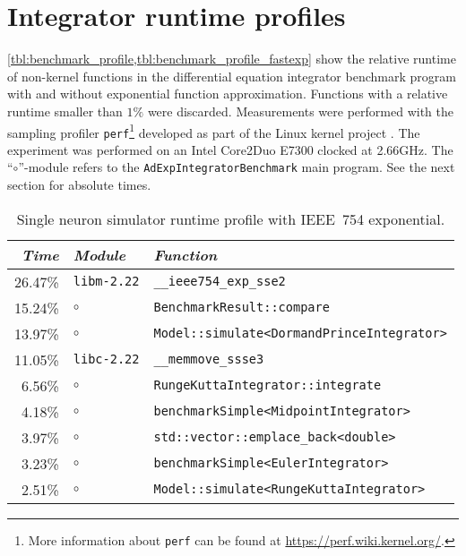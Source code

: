 \section{Integrator runtime profiles}

\cref{tbl:benchmark_profile,tbl:benchmark_profile_fastexp} show the relative runtime of non-kernel functions in the differential equation integrator benchmark program with and without exponential function approximation. Functions with a relative runtime smaller than $1\%$ were discarded. Measurements were performed with the sampling profiler \texttt{perf}\footnote{More information about \texttt{perf} can be found at \url{https://perf.wiki.kernel.org/}.} developed as part of the Linux kernel project \cite{de2010new}. The experiment was performed on an Intel Core2Duo E7300 \CPU clocked at 2.66GHz. The \enquote{$\circ$}-module refers to the \texttt{AdExpIntegratorBenchmark} main program. See the next section for absolute times.

\begin{table}[h]
	\caption[Simulator profile with IEEE~754 exponential]{Single neuron simulator runtime profile with IEEE~754 exponential.}
	\label{tbl:benchmark_profile}
	\small
	\centering
	\begin{tabular}{r l l}
		\toprule
		\textit{Time} & \textit{Module} & \textit{Function} \\
		\midrule
		26.47\% & \texttt{libm-2.22} & \texttt{\_\_ieee754\_exp\_sse2} \\
		15.24\% & $\circ$  & \texttt{BenchmarkResult::compare} \\
		13.97\% & $\circ$  & \texttt{Model::simulate<DormandPrinceIntegrator>} \\
		11.05\% & \texttt{libc-2.22} & \texttt{\_\_memmove\_ssse3} \\
		6.56\% & $\circ$  & \texttt{RungeKuttaIntegrator::integrate} \\
		4.18\% & $\circ$ & \texttt{benchmarkSimple<MidpointIntegrator>} \\
		3.97\% & $\circ$  & \texttt{std::vector::emplace\_back<double>} \\
		3.23\% & $\circ$  & \texttt{benchmarkSimple<EulerIntegrator>} \\
		2.51\% & $\circ$  & \texttt{Model::simulate<RungeKuttaIntegrator>} \\
		\bottomrule
	\end{tabular}
\end{table}

